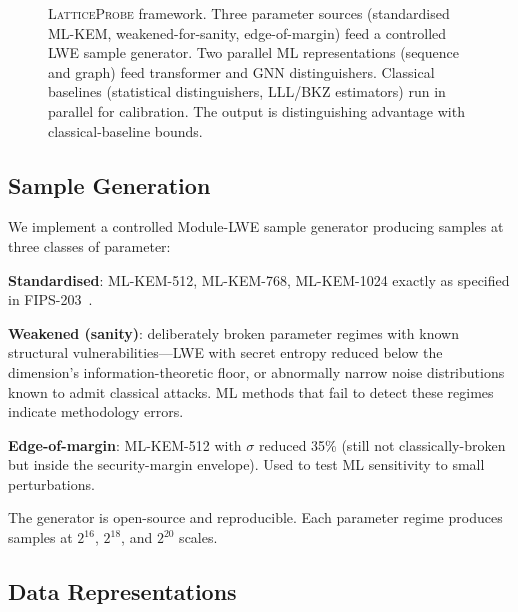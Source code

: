 \documentclass[sigconf,nonacm]{acmart}
\begin{document}
\begin{figure}[t]
\caption{\textsc{LatticeProbe} framework. Three parameter sources
  (standardised ML-KEM, weakened-for-sanity, edge-of-margin) feed a
  controlled LWE sample generator. Two parallel ML representations
  (sequence and graph) feed transformer and GNN distinguishers.
  Classical baselines (statistical distinguishers, LLL/BKZ
  estimators) run in parallel for calibration. The output is
  distinguishing advantage with classical-baseline bounds.}
\label{fig:framework}
\end{figure}

\subsection{Sample Generation}

We implement a controlled Module-LWE sample generator producing
samples at three classes of parameter:

\textbf{Standardised}: ML-KEM-512, ML-KEM-768, ML-KEM-1024 exactly
as specified in FIPS-203~\cite{nist2024fips203}.

\textbf{Weakened (sanity)}: deliberately broken parameter regimes
with known structural vulnerabilities---LWE with secret entropy
reduced below the dimension's information-theoretic floor, or
abnormally narrow noise distributions known to admit classical
attacks. ML methods that fail to detect these regimes indicate
methodology errors.

\textbf{Edge-of-margin}: ML-KEM-512 with $\sigma$ reduced 35\% (still
not classically-broken but inside the security-margin envelope).
Used to test ML sensitivity to small perturbations.

The generator is open-source and reproducible. Each parameter regime
produces samples at $2^{16}$, $2^{18}$, and $2^{20}$ scales.

\subsection{Data Representations}
\end{document}
